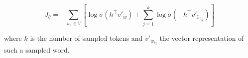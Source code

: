 \documentclass[6pt]{article}
\begin{document}
\begin{equation}
J_{\theta}  = - \sum_{w_i \in V} [\log \sigma(h^{\top}v'_w)
+ \sum_{j=1}^{k}\log \sigma(-h^{\top}v'_{\tilde{w}_{ij}})]
\label{eq:neg_sampling_3}
\end{equation}

where $k$ is the number of sampled tokens and $v'_{\tilde{w}_{ij}}$ the vector representation of such a sampled word.

\end{document}
